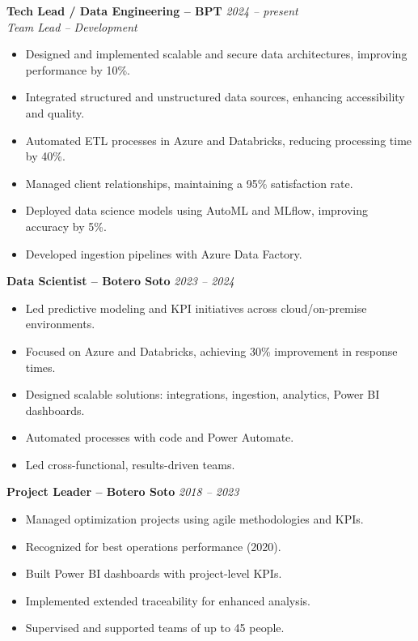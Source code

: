 \textbf{Tech Lead / Data Engineering – BPT} \hfill \textit{2024 – present} \\
\textit{Team Lead – Development} \\[-0.4em]
\begin{itemize}[leftmargin=*]
    \item Designed and implemented scalable and secure data architectures, improving performance by 10\%.
    \item Integrated structured and unstructured data sources, enhancing accessibility and quality.
    \item Automated ETL processes in Azure and Databricks, reducing processing time by 40\%.
    \item Managed client relationships, maintaining a 95\% satisfaction rate.
    \item Deployed data science models using AutoML and MLflow, improving accuracy by 5\%.
    \item Developed ingestion pipelines with Azure Data Factory.
\end{itemize}

\vspace{0.3em}

\textbf{Data Scientist – Botero Soto} \hfill \textit{2023 – 2024} \\[-0.4em]
\begin{itemize}[leftmargin=*]
    \item Led predictive modeling and KPI initiatives across cloud/on-premise environments.
    \item Focused on Azure and Databricks, achieving 30\% improvement in response times.
    \item Designed scalable solutions: integrations, ingestion, analytics, Power BI dashboards.
    \item Automated processes with code and Power Automate.
    \item Led cross-functional, results-driven teams.
\end{itemize}

\vspace{0.3em}

\textbf{Project Leader – Botero Soto} \hfill \textit{2018 – 2023} \\[-0.4em]
\begin{itemize}[leftmargin=*]
    \item Managed optimization projects using agile methodologies and KPIs.
    \item Recognized for best operations performance (2020).
    \item Built Power BI dashboards with project-level KPIs.
    \item Implemented extended traceability for enhanced analysis.
    \item Supervised and supported teams of up to 45 people.
\end{itemize}
